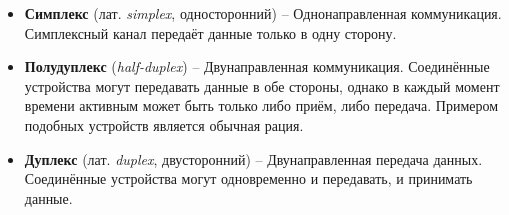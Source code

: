\documentclass[../sparc.tex]{subfiles}
\begin{document}
\begin{itemize}
\item \textbf{Симплекс} (лат. \emph{simplex}, односторонний) -- Однонаправленная
  коммуникация.  Симплексный канал передаёт данные только в одну сторону.
\item \textbf{Полудуплекс} (\emph{half-duplex}) -- Двунаправленная коммуникация.
  Соединённые устройства могут передавать данные в обе стороны, однако в каждый
  момент времени активным может быть только либо приём, либо передача.  Примером
  подобных устройств является обычная рация.
\item \textbf{Дуплекс} (лат. \emph{duplex}, двусторонний) -- Двунаправленная
  передача данных.  Соединённые устройства могут одновременно и передавать, и
  принимать данные.
\end{itemize}
\end{document}

